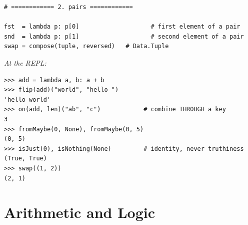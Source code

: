 \documentclass[11pt,letterpaper]{book}
\begin{document}
\begin{lstlisting}[style=code]
# ============ 2. pairs ============

fst  = lambda p: p[0]                    # first element of a pair
snd  = lambda p: p[1]                    # second element of a pair
swap = compose(tuple, reversed)   # Data.Tuple
\end{lstlisting}

\noindent\textit{At the REPL:}
\begin{lstlisting}[style=spec]
>>> add = lambda a, b: a + b
>>> flip(add)("world", "hello ")
'hello world'
>>> on(add, len)("ab", "c")            # combine THROUGH a key
3
>>> fromMaybe(0, None), fromMaybe(0, 5)
(0, 5)
>>> isJust(0), isNothing(None)         # identity, never truthiness
(True, True)
>>> swap((1, 2))
(2, 1)
\end{lstlisting}
\chapter{Arithmetic and Logic}
\end{document}
